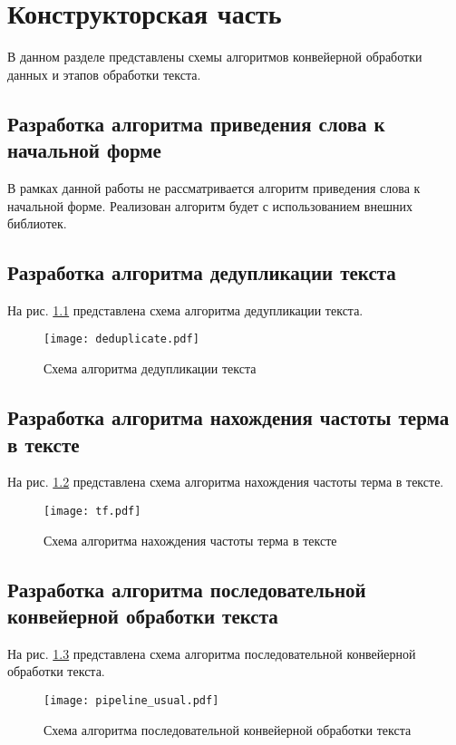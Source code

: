 \chapter{Конструкторская часть}

В данном разделе представлены схемы алгоритмов конвейерной обработки данных и этапов обработки текста.

\section{Разработка алгоритма приведения слова к начальной форме}
В рамках данной работы не рассматривается алгоритм приведения слова к начальной форме. Реализован алгоритм будет с использованием внешних библиотек.

\section{Разработка алгоритма дедупликации текста}
На рис. \ref{img:alg1} представлена схема алгоритма дедупликации текста.

\begin{figure}[h!]
\centering
    \texttt{[image: deduplicate.pdf]}
    \caption{Схема алгоритма дедупликации текста}
    \label{img:alg1}	
\end{figure}

\newpage

\section{Разработка алгоритма нахождения частоты терма в тексте}
На рис. \ref{img:alg2} представлена схема алгоритма нахождения частоты терма в тексте.

\begin{figure}[h!]
\centering
    \texttt{[image: tf.pdf]}
    \caption{Схема алгоритма нахождения частоты терма в тексте}
    \label{img:alg2}	
\end{figure}

\newpage

\section{Разработка алгоритма последовательной конвейерной обработки текста}
На рис. \ref{img:alg3} представлена схема алгоритма последовательной конвейерной обработки текста.

\begin{figure}[h!]
\centering
    \texttt{[image: pipeline\_usual.pdf]}
    \caption{Схема алгоритма последовательной конвейерной обработки текста}
    \label{img:alg3}	
\end{figure}


